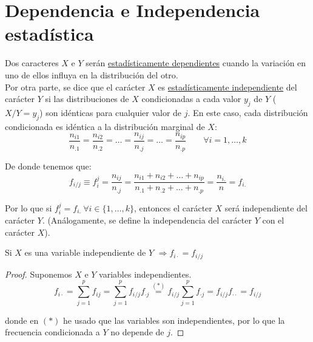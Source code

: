\section{Dependencia e Independencia estadística}

Dos caracteres $X$ e $Y$ serán \underline{estadísticamente dependientes} cuando la variación en uno de ellos influya en la distribución del otro.\\


Por otra parte, se dice que el carácter $X$ es \underline{estadísticamente independiente} del carácter $Y$ si las distribuciones
de $X$ condicionadas a cada valor $y_j$ de $Y$ ($X/Y=y_j$) son idénticas para cualquier valor de $j$. En este caso,
cada distribución condicionada es idéntica a la distribución marginal de $X$:
$$\dfrac{n_{i1}}{n_{\text{.}1}} = \dfrac{n_{i2}}{n_{\text{.}2}} = \ldots = \dfrac{n_{ij}}{n_{.j}} = \ldots = \dfrac{n_{ip}}{n_{.p}} \qquad \forall i = 1, \ldots, k$$

De donde tenemos que:
$$f_{i/j} \equiv f_i^j = \dfrac{n_{ij}}{n_{.j}} = \dfrac{n_{i1} + n_{i2} + \ldots + n_{ip}}{n_{.1} + n_{.2} + \ldots + n_{.p}}
    = \dfrac{n_{i.}}{n} = f_{i.}$$

Por lo que si $f_i^j = f_{i.} \ \forall i \in \{1, \ldots, k\}$, entonces el carácter $X$ será independiente del
carácter $Y$. (Análogamente, se define la independencia del carácter $Y$ con el carácter $X$).

\begin{prop}
Si $X$ es una variable independiente de $Y$ $\Longrightarrow f_{i\cdot} = f_{i/j}$
\end{prop}
\begin{proof}
Suponemos $X$ e $Y$ variables independientes.
$$f_{i\cdot} = \sum_{j=1}^p f_{ij} = \sum_{j=1}^p f_{i/j}f_{\cdot j} \stackrel{(\ast)}{=} f_{i/j}\sum_{j=1}^pf_{\cdot j} = f_{i/j} f_{\cdot \cdot} = f_{i/j}$$

donde en $(\ast)$ he usado que las variables son independientes, por lo que la frecuencia condicionada a $Y$ no depende de $j$.
\end{proof}

